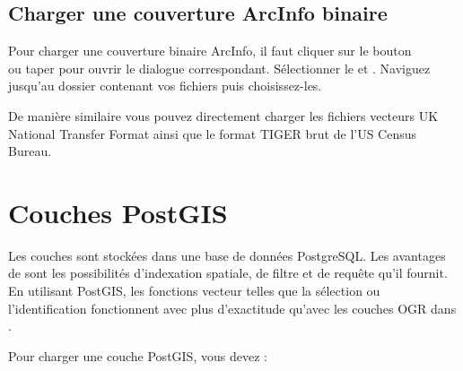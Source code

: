 \subsection{Charger une couverture ArcInfo binaire}
Pour charger une couverture binaire ArcInfo, il faut cliquer sur le bouton\\  ou taper  pour ouvrir le dialogue correspondant. Sélectionner le  et . Naviguez jusqu'au dossier contenant vos fichiers puis choisissez-les.
\par
De manière similaire vous pouvez directement charger les fichiers vecteurs UK National Transfer Format ainsi que le format TIGER brut de l'US Census Bureau.

\section{Couches PostGIS}
\label{label_postgis}

Les couches \pg sont stockées dans une base de données PostgreSQL. Les avantages de \pg sont les possibilités d'indexation spatiale, de filtre et de requête qu'il fournit. En utilisant PostGIS, les fonctions vecteur telles que la sélection ou l'identification fonctionnent avec plus d'exactitude qu'avec les couches OGR dans \qg.

Pour charger une couche PostGIS, vous devez :


